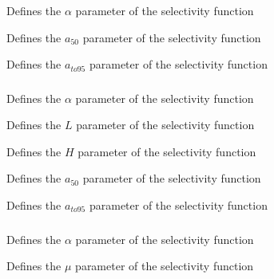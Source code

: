 \subsubsection[Logistic]{}

 {Defines the $\alpha$ parameter of the selectivity function}

 {Defines the $a_{50}$ parameter of the selectivity function}

 {Defines the $a_{to95}$ parameter of the selectivity function}

\subsubsection[Logistic producing]{}

 {Defines the $\alpha$ parameter of the selectivity function}

 {Defines the $L$ parameter of the selectivity function}

 {Defines the $H$ parameter of the selectivity function}

 {Defines the $a_{50}$ parameter of the selectivity function}

 {Defines the $a_{to95}$ parameter of the selectivity function}

\subsubsection[Double-normal]{}

 {Defines the $\alpha$ parameter of the selectivity function}

 {Defines the $\mu$ parameter of the selectivity function}

